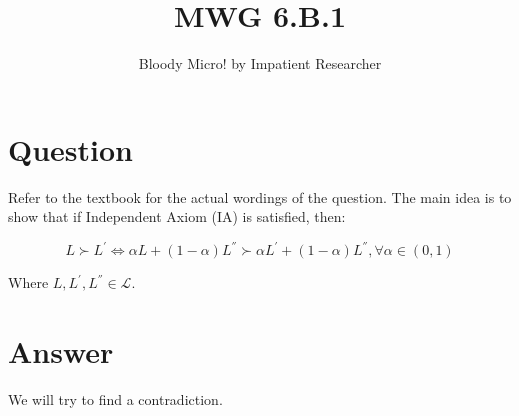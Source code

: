 \documentclass{tufte-handout}
\title{MWG 6.B.1}
\author{Bloody Micro! by Impatient Researcher}
\begin{document}
\maketitle%


\section{Question}\label{sec:question}

Refer to the textbook for the actual wordings of the question. The main idea is to show that if Independent Axiom (IA) is satisfied, then:

$$L \succ L^{'} \iff \alpha L + (1 - \alpha) L^{''} \succ \alpha L^{'} + (1 - \alpha) L^{''}, \forall \alpha \in (0,1)$$

\noindent Where $L, L^{'}, L^{''} \in \mathcal{L}$.

\section{Answer}\label{sec:answer}

We will try to find a contradiction.
\end{document}
